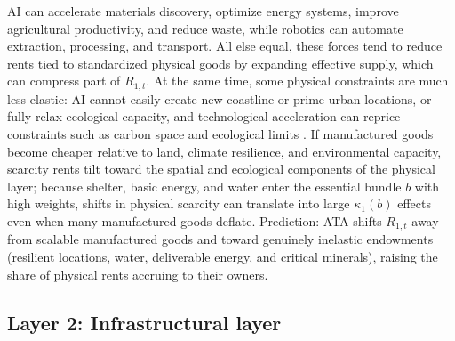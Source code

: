 \documentclass[11pt]{article}
\begin{document}
AI can accelerate materials discovery, optimize energy systems, improve agricultural productivity, and reduce waste, while robotics can automate extraction, processing, and transport. All else equal, these forces tend to reduce rents tied to standardized physical goods by expanding effective supply, which can compress part of \(R_{1,t}\). At the same time, some physical constraints are much less elastic: AI cannot easily create new coastline or prime urban locations, or fully relax ecological capacity, and technological acceleration can reprice constraints such as carbon space and ecological limits \citep[e.g.][]{Rockstrom2009}. If manufactured goods become cheaper relative to land, climate resilience, and environmental capacity, scarcity rents tilt toward the spatial and ecological components of the physical layer; because shelter, basic energy, and water enter the essential bundle \(b\) with high weights, shifts in physical scarcity can translate into large \(\kappa_1(b)\) effects even when many manufactured goods deflate. Prediction: ATA shifts \(R_{1,t}\) away from scalable manufactured goods and toward genuinely inelastic endowments (resilient locations, water, deliverable energy, and critical minerals), raising the share of physical rents accruing to their owners.

\subsection{Layer 2: Infrastructural layer}
\end{document}
